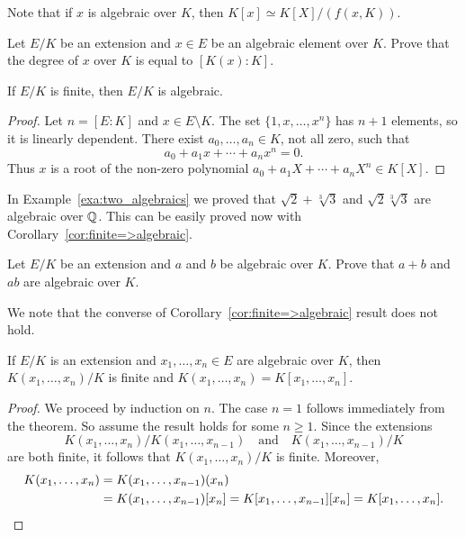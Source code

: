 Note that if $x$ is algebraic over $K$, then
$K[x]\simeq K[X]/(f(x,K))$. 

\begin{exercise}
\label{xca:degree_of_x}
    Let $E/K$ be an extension and $x\in E$ be an algebraic element over $K$.
    Prove that the degree of $x$ over $K$ is equal to $[K(x):K]$. 
\end{exercise}

\begin{corollary}
\label{cor:finite=>algebraic}
	If $E/K$ is finite, then $E/K$ is algebraic. 
\end{corollary}

\begin{proof}
	Let $n=[E:K]$ and $x\in E\setminus K$. The set $\{1,x,\dots,x^n\}$ has $n+1$ elements, so it is linearly dependent. 
	There exist $a_0,\dots,a_n\in K$, not all zero, such that
	\[
        a_0+a_1x+\cdots+a_nx^n=0.
        \]
        Thus $x$ is a root of the non-zero
	polynomial $a_0+a_1X+\cdots+a_nX^n\in K[X]$. 
\end{proof}

In Example~\ref{exa:two_algebraics} we 
proved that $\sqrt{2}+\sqrt[3]{3}$ and $\sqrt{2}\sqrt[3]{3}$ 
are algebraic over $\mathbb{Q}$. This can be easily proved
now with Corollary~\ref{cor:finite=>algebraic}. 

\begin{exercise}
\label{xca:algebraic}
    Let $E/K$ be an extension and 
    $a$ and $b$ be algebraic over $K$. Prove 
    that $a+b$ and $ab$ are algebraic over $K$. 
\end{exercise}

We note that the converse of Corollary~\ref{cor:finite=>algebraic} result does not hold. 

\begin{corollary}
\label{cor:finite type finite}
	If $E/K$ is an extension and $x_1,\dots,x_n\in E$ 
	are algebraic over $K$, then 
	$K(x_1,\dots,x_n)/K$ is finite and
	$K(x_1,\dots,x_n)=K[x_1,\dots,x_n]$. 
\end{corollary}

\begin{proof}
	We proceed by induction on $n$. The case $n=1$ follows immediately from 
	the theorem. So assume the result holds for some $n\geq1$. Since the extensions 
	\[
    K(x_1,\dots,x_n)/K(x_1,\dots,x_{n-1})\quad\text{and}\quad 
    K(x_1,\dots,x_{n-1})/K
    \]
    are
	both finite, it follows that $K(x_1,\dots,x_n)/K$ is finite. Moreover, 
	\begin{align*}
	K(x_1,\dots,x_n)&=K(x_1,\dots,x_{n-1})(x_n)\\
	&=K(x_1,\dots,x_{n-1})[x_n]=K[x_1,\dots,x_{n-1}][x_n]=K[x_1,\dots,x_n].\qedhere
    \end{align*}
\end{proof}

